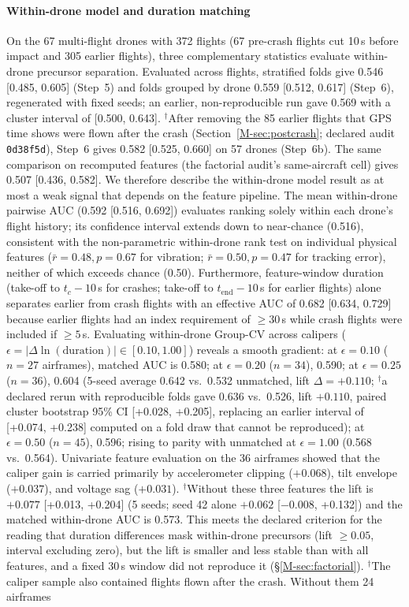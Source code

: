 \documentclass[preprint,12pt]{elsarticle}
\begin{document}
\paragraph{Within-drone model and duration matching}
On the 67 multi-flight drones with 372 flights (67 pre-crash flights cut 10\,s before impact and 305 earlier flights), three complementary statistics evaluate within-drone precursor separation. Evaluated across flights, stratified folds give 0.546 [0.485, 0.605] (Step~5) and folds grouped by drone 0.559 [0.512, 0.617] (Step~6), regenerated with fixed seeds; an earlier, non-reproducible run gave 0.569 with a cluster interval of [0.500, 0.643]. $^\dagger$After removing the 85 earlier flights that GPS time shows were flown after the crash (Section~\ref{M-sec:postcrash}; declared audit \texttt{0d38f5d}), Step~6 gives 0.582 [0.525, 0.660] on 57 drones (Step~6b). The same comparison on recomputed features (the factorial audit's same-aircraft cell) gives 0.507 [0.436, 0.582]. We therefore describe the within-drone model result as at most a weak signal that depends on the feature pipeline. The mean within-drone pairwise AUC (0.592 [0.516, 0.692]) evaluates ranking solely within each drone's flight history; its confidence interval extends down to near-chance (0.516), consistent with the non-parametric within-drone rank test on individual physical features ($\bar r = 0.48, p = 0.67$ for vibration; $\bar r = 0.50, p = 0.47$ for tracking error), neither of which exceeds chance (0.50). Furthermore, feature-window duration (take-off to $t_c - 10$\,s for crashes; take-off to $t_{\text{end}} - 10$\,s for earlier flights) alone separates earlier from crash flights with an effective AUC of 0.682 [0.634, 0.729] because earlier flights had an index requirement of $\ge 30$\,s while crash flights were included if $\ge 5$\,s. Evaluating within-drone Group-CV across calipers ($\epsilon = |\Delta \ln(\text{duration})| \in [0.10, 1.00]$) reveals a smooth gradient: at $\epsilon=0.10$ ($n=27$ airframes), matched AUC is 0.580; at $\epsilon=0.20$ ($n=34$), 0.590; at $\epsilon=0.25$ ($n=36$), 0.604 (5-seed average 0.642 vs.\ 0.532 unmatched, lift $\Delta = +0.110$; $^\dagger$a declared rerun with reproducible folds gave 0.636 vs.\ 0.526, lift $+0.110$, paired cluster bootstrap 95\% CI [+0.028, +0.205], replacing an earlier interval of [+0.074, +0.238] computed on a fold draw that cannot be reproduced); at $\epsilon=0.50$ ($n=45$), 0.596; rising to parity with unmatched at $\epsilon=1.00$ (0.568 vs.\ 0.564). Univariate feature evaluation on the 36 airframes showed that the caliper gain is carried primarily by accelerometer clipping ($+0.068$), tilt envelope ($+0.037$), and voltage sag ($+0.031$). $^\dagger$Without these three features the lift is $+0.077$ [+0.013, +0.204] (5 seeds; seed 42 alone $+0.062$ [$-0.008$, +0.132]) and the matched within-drone AUC is 0.573. This meets the declared criterion for the reading that duration differences mask within-drone precursors (lift $\ge 0.05$, interval excluding zero), but the lift is smaller and less stable than with all features, and a fixed 30\,s window did not reproduce it (§\ref{M-sec:factorial}). $^\dagger$The caliper sample also contained flights flown after the crash. Without them 24 airframes 
\end{document}
